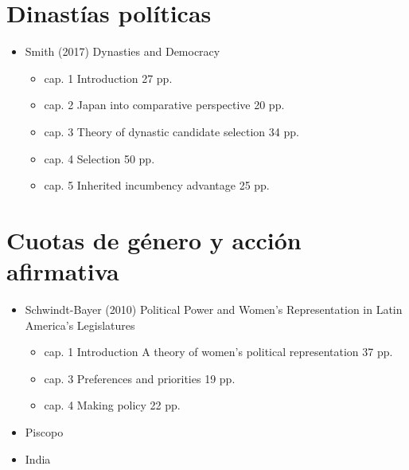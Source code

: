 \documentclass{article}
\begin{document}
\section{Dinastías políticas}
\label{sec:org2af1d9f}
\begin{itemize}
\item Smith (2017) Dynasties and Democracy
\begin{itemize}
\item cap. 1 Introduction 27 pp.
\item cap. 2 Japan into comparative perspective 20 pp.
\item cap. 3 Theory of dynastic candidate selection 34 pp.
\item cap. 4 Selection 50 pp.
\item cap. 5 Inherited incumbency advantage 25 pp.
\end{itemize}
\end{itemize}

\section{Cuotas de género y acción afirmativa}
\label{sec:orgb1848c6}
\begin{itemize}
\item Schwindt-Bayer (2010) Political Power and Women's Representation in Latin America's Legislatures 
\begin{itemize}
\item cap. 1 Introduction A theory of women's political representation 37 pp.
\item cap. 3 Preferences and priorities 19 pp.
\item cap. 4 Making policy 22 pp.
\end{itemize}
\item Piscopo
\item India
\end{itemize}
\end{document}
